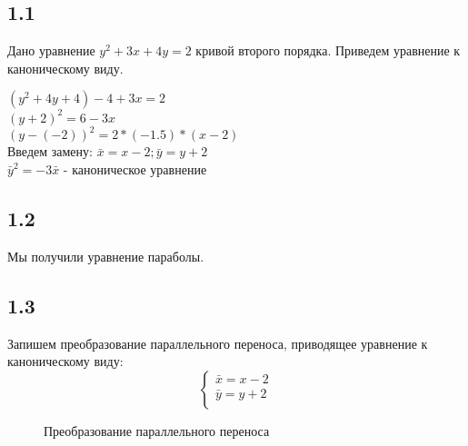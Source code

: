 \documentclass[12pt, a4paper]{article}
\begin{document}
\subsection*{1.1}
Дано уравнение $y^2+3x+4y=2$ кривой второго порядка. Приведем уравнение к каноническому виду.
\begin{center}
     $(y^2+4y+4)-4+3x=2$\\
     $(y+2)^2=6-3x$\\
     $(y-(-2))^2=2*(-1.5)*(x-2)$\\
     Введем замену: $\bar x = x-2; \bar y = y+2$\\
     $\bar y^2 = -3\bar x $ - каноническое уравнение\\
\end{center}

\subsection*{1.2}
Мы получили уравнение параболы.
\newpage
\subsection*{1.3}
Запишем преобразование параллельного переноса, приводящее уравнение к каноническому виду:
\begin{equation*}
 \begin{cases}
   \bar x = x - 2\\
   \bar y = y + 2\\
 \end{cases}
\end{equation*}
\begin{figure}[h!]
    \begin{center}
    \caption{Преобразование параллельного переноса}
    \end{center}
\end{figure}
\newpage
\end{document}
